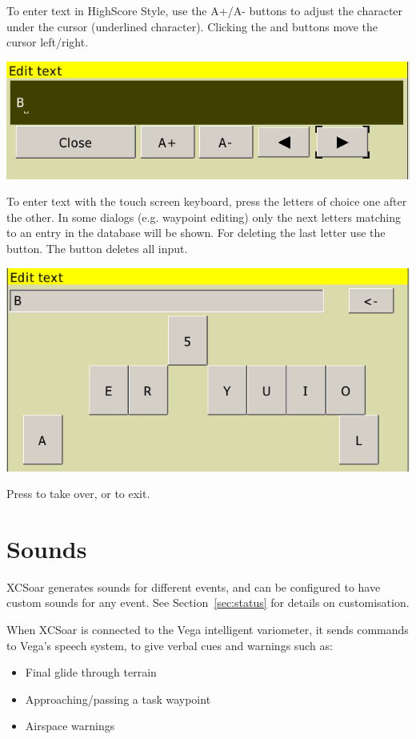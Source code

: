 To enter text in HighScore Style, use the A+/A- buttons to adjust the character under the
cursor (underlined character). Clicking the \button{$<$} and \button{$>$} buttons move the
cursor left/right.  

\begin{center}
\includegraphics[angle=0,width=0.6\linewidth,keepaspectratio='true']{figures/textentry.png}
\end{center}

To enter text with the touch screen keyboard, press the letters of choice one after the other. 
In some dialogs (e.g. waypoint editing) only the next letters matching to an entry in the database 
will be shown. For deleting the last letter use the \button{$<-$} button. The
 button deletes all input.

\begin{center}
\includegraphics[angle=0,width=0.6\linewidth,keepaspectratio='true']{figures/textentry_keyboard.png}
\end{center}

Press  to take over, or  to exit.

\section{Sounds}

XCSoar generates sounds for different events, and can be configured to
have custom sounds for any event.  See Section~\ref{sec:status} for
details on customisation.

When XCSoar is connected to the Vega intelligent variometer, it sends
commands to Vega's speech system, to give verbal cues and warnings such as:
\begin{itemize}
\item Final glide through terrain
\item Approaching/passing a task waypoint
\item Airspace warnings
\end{itemize}


